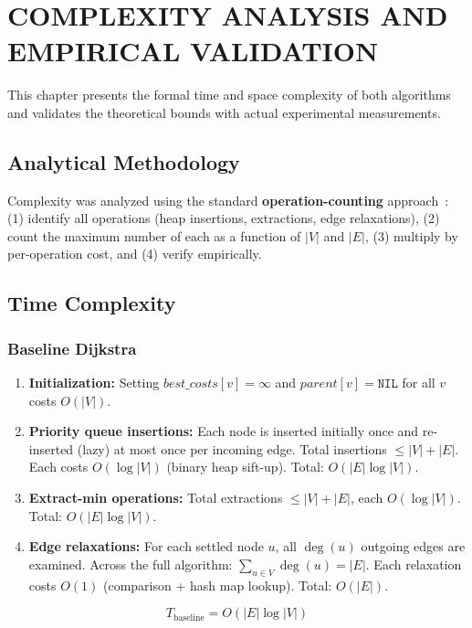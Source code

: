 \chapter{COMPLEXITY ANALYSIS AND EMPIRICAL VALIDATION}\label{chap:complexity}

This chapter presents the formal time and space complexity of both algorithms and validates the theoretical bounds with actual experimental measurements.

\section{Analytical Methodology}

Complexity was analyzed using the standard \textbf{operation-counting} approach~\citep{cormen2009}: (1) identify all operations (heap insertions, extractions, edge relaxations), (2) count the maximum number of each as a function of $|V|$ and $|E|$, (3) multiply by per-operation cost, and (4) verify empirically.

\section{Time Complexity}

\subsection{Baseline Dijkstra}

\begin{enumerate}
    \item \textbf{Initialization:} Setting $\mathit{best\_costs}[v]=\infty$ and $\mathit{parent}[v]=\texttt{NIL}$ for all $v$ costs $O(|V|)$.
    \item \textbf{Priority queue insertions:} Each node is inserted initially once and re-inserted (lazy) at most once per incoming edge. Total insertions $\leq |V|+|E|$. Each costs $O(\log|V|)$ (binary heap sift-up). Total: $O(|E|\log|V|)$.
    \item \textbf{Extract-min operations:} Total extractions $\leq |V|+|E|$, each $O(\log|V|)$. Total: $O(|E|\log|V|)$.
    \item \textbf{Edge relaxations:} For each settled node $u$, all $\deg(u)$ outgoing edges are examined. Across the full algorithm: $\sum_{u\in V}\deg(u)=|E|$. Each relaxation costs $O(1)$ (comparison + hash map lookup). Total: $O(|E|)$.
\end{enumerate}

\[
T_{\text{baseline}} = O(|E|\log|V|)
\]

